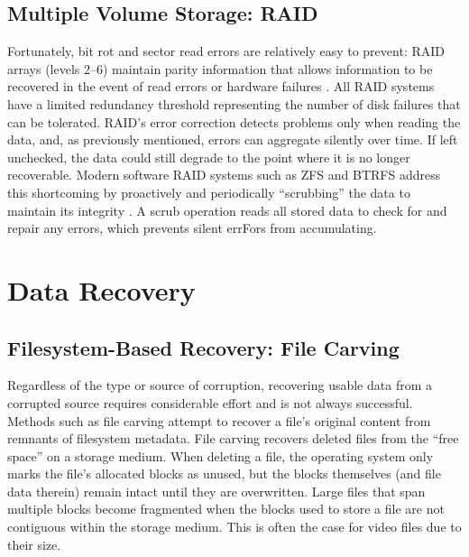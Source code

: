 \subsection{Multiple Volume Storage: RAID}

Fortunately, bit rot and sector read errors are relatively easy to prevent: RAID arrays (levels 2--6) maintain parity information that allows information to be recovered in the event of read errors or hardware failures \cite{chen1994}. All RAID systems have a limited redundancy threshold representing the number of disk failures that can be tolerated. RAID's error correction detects problems only when reading the data, and, as previously mentioned, errors can aggregate silently over time. If left unchecked, the data could still degrade to the point where it is no longer recoverable. Modern software RAID systems such as ZFS and BTRFS address this shortcoming by proactively and periodically ``scrubbing'' the data to maintain its integrity \cite{zfs} \cite{zfs-scrub} \cite{btrfs}. A scrub operation reads all stored data to check for and repair any errors, which prevents silent errFors from accumulating.


\section{Data Recovery}

\subsection{Filesystem-Based Recovery: File Carving}

Regardless of the type or source of corruption, recovering usable data from a corrupted source requires considerable effort and is not always successful. Methods such as file carving \cite{pal2009} \cite{poisel2013} attempt to recover a file's original content from remnants of filesystem metadata. File carving recovers deleted files from the ``free space'' on a storage medium. When deleting a file, the operating system only marks the file's allocated blocks as unused, but the blocks themselves (and file data therein) remain intact until they are overwritten. Large files that span multiple blocks become fragmented when the blocks used to store a file are not contiguous within the storage medium. This is often the case for video files due to their size.

